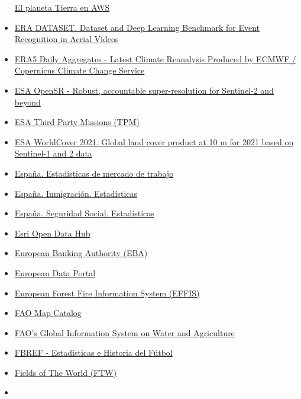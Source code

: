 \documentclass[
]{article}
\begin{document}
\begin{itemize}
  \href{https://aws.amazon.com/es/earth/}{El planeta Tierra en AWS}
\item
  \href{https://lcmou.github.io/ERA_Dataset/}{ERA DATASET. Dataset and
  Deep Learning Benchmark for Event Recognition in Aerial Videos}
\item
  \href{https://developers.google.com/earth-engine/datasets/catalog/ECMWF_ERA5_DAILY}{ERA5
  Daily Aggregates - Latest Climate Reanalysis Produced by ECMWF /
  Copernicus Climate Change Service}
\item
  \href{https://isp.uv.es/opensr/}{ESA OpenSR - Robust, accountable
  super-resolution for Sentinel-2 and beyond}
\item
  \href{https://earth.esa.int/eogateway/missions/third-party-missions}{ESA
  Third Party Missions (TPM)}
\item
  \href{https://worldcover2021.esa.int/}{ESA WorldCover 2021. Global
  land cover product at 10 m for 2021 based on Sentinel-1 and 2 data}
\item
  \href{https://www.mites.gob.es/es/estadisticas/mercado_trabajo/index.htm}{España.
  Estadísticas de mercado de trabajo}
\item
  \href{https://www.inclusion.gob.es/web/opi/estadisticas}{España.
  Inmigración. Estadísticas}
\item
  \href{https://www.seg-social.es/wps/portal/wss/internet/EstadisticasPresupuestosEstudios/Estadisticas}{España.
  Seguridad Social. Estadísticas}
\item
  \href{https://hub.arcgis.com/search}{Esri Open Data Hub}
\item
  \href{https://www.eba.europa.eu/risk-and-data-analysis}{European
  Banking Authority (EBA)}
\item
  \href{https://www.europeandataportal.eu/}{European Data Portal}
\item
  \href{https://forest-fire.emergency.copernicus.eu/}{European Forest
  Fire Information System (EFFIS)}
\item
  \href{http://www.fao.org/geonetwork}{FAO Map Catalog}
\item
  \href{https://www.fao.org/aquastat/en/geospatial-information/wapor}{FAO's
  Global Information System on Water and Agriculture}
\item
  \href{https://fbref.com/es/}{FBREF - Estadísticas e Historia del
  Fútbol}
\item
  \href{https://beta.source.coop/repositories/kerner-lab/fields-of-the-world/description/}{Fields
  of The World (FTW)}
\item

\end{itemize}
\end{document}
